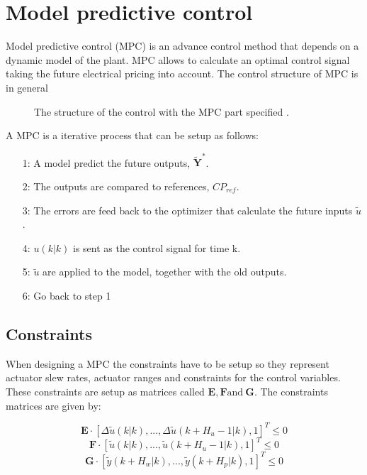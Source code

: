 \section{Model predictive control}

Model predictive control (MPC) is an advance control method that depends on a dynamic model of the plant. MPC allows to calculate an optimal control signal taking the future electrical pricing into account. The control structure of MPC is in general 

\begin{figure}[H]
\centering
 
\caption{The structure of the control with the MPC part specified \cite{Camacho2007}.}
\end{figure}

A MPC is a iterative process that can be setup as follows: 

\begin{itemize}
\item[1:] A model predict the future outputs, $\pmb{\tilde Y^*}$.
\item[2:] The outputs are compared to references, $CP_{ref}$.
\item[3:] The errors are feed back to the optimizer that calculate the future inputs $\tilde u$.
\item[4:] $u(k|k)$ is sent as the control signal for time k.
\item[5:] $\tilde u$ are applied to the model, together with the old outputs.
\item[6:] Go back to step 1 
\end{itemize}





\subsection{Constraints}

When designing a MPC the constraints have to be setup so they represent actuator slew rates, actuator ranges and constraints for the control variables. These constraints are setup as matrices called $\pmb{E}, \pmb{F} \text{and} \:\pmb{G}$. The constraints matrices are given by: 

\begin{equation}
\pmb{E} \cdot [\Delta\tilde u(k|k),...,\Delta\tilde u(k+H_u-1|k),1]^T \leq 0 
\label{eq:slewrate}
\end{equation}
\begin{equation}
\pmb{F} \cdot [\tilde u(k|k),...,\tilde u(k+H_u-1|k),1]^T \leq 0 
\label{eq:actranges}
\end{equation}
\begin{equation}
\pmb{G} \cdot [\tilde y(k+H_w|k),...,\tilde y(k+H_p|k),1]^T \leq 0
\label{eq:controlvar}
\end{equation}


